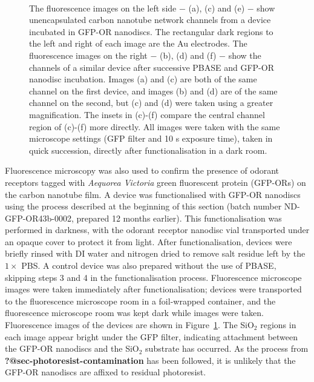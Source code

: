\documentclass[
  a4paper,
]{scrbook}
\begin{document}
\begin{figure}
\begin{minipage}[t]{0.45\linewidth}
{{}

}

\end{minipage}%
%
\begin{minipage}[t]{0.01\linewidth}

{\centering 

~

}

\end{minipage}%

\caption{\label{fig-PBASE-GFP-ORs}The fluorescence images on the left
side \(-\) (a), (c) and (e) \(-\) show unencapsulated carbon nanotube
network channels from a device incubated in GFP-OR nanodiscs. The
rectangular dark regions to the left and right of each image are the Au
electrodes. The fluorescence images on the right \(-\) (b), (d) and (f)
\(-\) show the channels of a similar device after successive PBASE and
GFP-OR nanodisc incubation. Images (a) and (c) are both of the same
channel on the first device, and images (b) and (d) are of the same
channel on the second, but (c) and (d) were taken using a greater
magnification. The insets in (c)-(f) compare the central channel region
of (c)-(f) more directly. All images were taken with the same microscope
settings (GFP filter and 10 s exposure time), taken in quick succession,
directly after functionalisation in a dark room.}

\end{figure}

Fluorescence microscopy was also used to confirm the presence of odorant
receptors tagged with \emph{Aequorea Victoria} green fluorescent protein
(GFP-ORs) on the carbon nanotube film. A device was functionalised with
GFP-OR nanodiscs using the process described at the beginning of this
section (batch number ND-GFP-OR43b-0002, prepared 12 months earlier).
This functionalisation was performed in darkness, with the odorant
receptor nanodisc vial transported under an opaque cover to protect it
from light. After functionalisation, devices were briefly rinsed with DI
water and nitrogen dried to remove salt residue left by the \(1 \times\)
PBS. A control device was also prepared without the use of PBASE,
skipping steps 3 and 4 in the functionalisation process. Fluorescence
microscope images were taken immediately after functionalisation;
devices were transported to the fluorescence microscope room in a
foil-wrapped container, and the fluorescence microscope room was kept
dark while images were taken. Fluorescence images of the devices are
shown in Figure~\ref{fig-PBASE-GFP-ORs}. The SiO\(_2\) regions in each
image appear bright under the GFP filter, indicating attachment between
the GFP-OR nanodiscs and the SiO\(_2\) substrate has occurred. As the
process from \textbf{?@sec-photoresist-contamination} has been followed,
it is unlikely that the GFP-OR nanodiscs are affixed to residual
photoresist.
\end{document}

